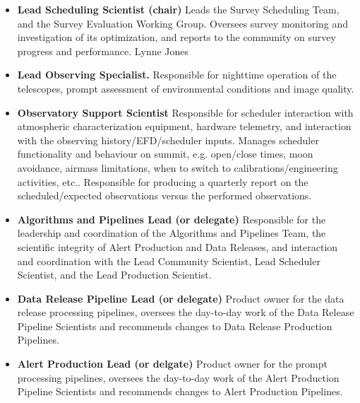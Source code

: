 \documentclass[OPS,authoryear,toc]{lsstdoc}
\begin{document}
\begin{itemize}
\item {
{\bf Lead Scheduling Scientist (chair)}
Leads the Survey Scheduling Team, and the Survey Evaluation Working Group. Oversees survey monitoring and investigation of its optimization, and reports to the community on survey progress and performance. 
 Lynne Jones
}
\item{
{\bf Lead Observing Specialist.}
 Responsible for nighttime operation of the telescopes,   prompt assessment of environmental conditions and image quality.  
}
\item{
{\bf Observatory Support Scientist}
 Responsible for scheduler interaction with atmospheric characterization equipment, hardware telemetry, and interaction with the observing history/EFD/scheduler inputs. Manages scheduler functionality and behaviour on summit, e.g. open/close times, moon avoidance, airmass limitations, when to switch to calibrations/engineering activities, etc.. Responsible for producing a quarterly report on the scheduled/expected observations versus the performed observations.  
}
\item{
{\bf Algorithms and Pipelines Lead (or delegate)}
 Responsible for the leadership and coordination of the Algorithms and Pipelines Team, the scientific integrity of Alert Production and Data Releases, and interaction and coordination with the Lead Community Scientist, Lead Scheduler Scientist, and the Lead Production Scientist. 
}
\item{
{\bf Data Release Pipeline Lead (or delegate)}
 Product owner for the data release processing pipelines,  oversees the day-to-day work of the Data Release Pipeline Scientists and recommends changes to Data Release Production Pipelines.
}
\item{
{\bf Alert Production Lead (or delgate)}
 Product owner for the  prompt processing pipelines, oversees the day-to-day work of the Alert Production Pipeline Scientists and recommends changes to Alert Production Pipelines.
}
\end{itemize}
\end{document}
